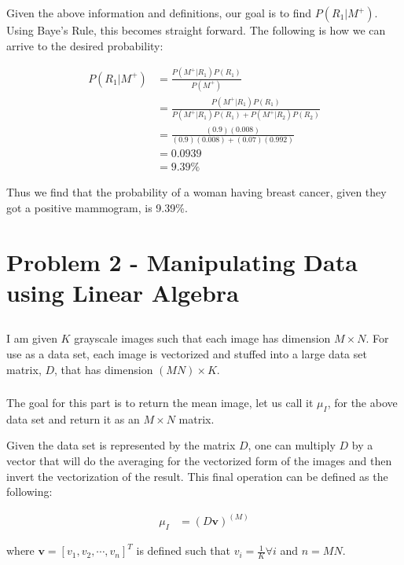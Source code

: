 \documentclass{article}[12pt]
\begin{document}
   Given the above information and definitions, our goal is to find $P(R_1 | M^{+})$. Using Baye's Rule, this becomes straight forward. The following is how we can arrive to the desired probability:
   
   \begin{align*}
   P(R_1 | M^{+}) &= \frac{P(M^{+} | R_1) P(R_1) }{P(M^{+})} \\
   &= \frac{P(M^{+} | R_1) P(R_1) }{P(M^{+} | R_1) P(R_1) + P(M^{+} | R_2) P(R_2)} \\
   &= \frac{(0.9) (0.008) }{(0.9) (0.008) + (0.07) (0.992)} \\
   &= 0.0939 \\
   &= 9.39\%
   \end{align*}
   
   Thus we find that the probability of a woman having breast cancer, given they got a positive mammogram, is 9.39\%.

	\newpage
	\section{Problem 2 - Manipulating Data using Linear Algebra}
	\subsection{}
	I am given $K$ grayscale images such that each image has dimension $M \times N$. For use as a data set, each image is vectorized and stuffed into a large data set matrix, $D$, that has dimension $(MN) \times K$.
	
	\subsubsection{}
	The goal for this part is to return the mean image, let us call it $\mu_I$, for the above data set and return it as an $M \times N$ matrix. 
	
	Given the data set is represented by the matrix $D$, one can multiply $D$ by a vector that will do the averaging for the vectorized form of the images and then invert the vectorization of the result. This final operation can be defined as the following:
	
	\begin{align*}
	\mu_I &= (D \boldsymbol{v} )^{(M)}
	\end{align*}
	
	where $\boldsymbol{v} = [v_1, v_2, \cdots, v_{n}]^{T}$ is defined such that $v_i = \frac{1}{K} \forall i$ and $n = MN$.
	
\end{document}
